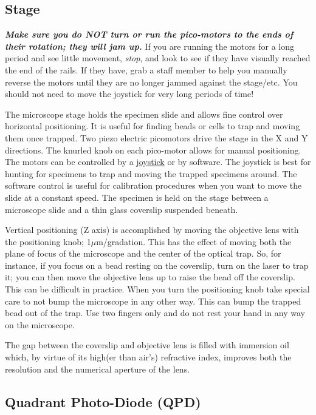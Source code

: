 \documentclass{../lab}
\begin{document}
\subsection{Stage}

\label{sec:stage}

\emph{\textbf{Make sure you do NOT turn or run the pico-motors to the ends of their rotation; they will jam up.}} If you are running the motors for a long period and see little movement, \textit{stop}, and look to see if they have visually reached the end of the rails. If they have, grab a staff member to help you manually reverse the motors until they are no longer jammed against the stage/etc. You should not need to move the joystick for very long periods of time!

The microscope stage holds the specimen slide and allows fine control over horizontal positioning. It is useful for finding beads or cells to trap and moving them once trapped. Two piezo electric picomotors drive the stage in the X and Y directions. The knurled knob on each pico-motor allows for manual positioning. The motors can be controlled by a \href{https://berkeley-physics111b.github.io/assets/pdf/oldwebsitestructure/JoystickManual.pdf}{joystick} or by software. The joystick is best for hunting for specimens to trap and moving the trapped specimens around. The software control is useful for calibration procedures when you want to move the slide at a constant speed. The specimen is held on the stage between a microscope slide and a thin glass coverslip suspended beneath.

Vertical positioning (Z axis) is accomplished by moving the objective lens with the positioning knob; 1$\mu$m/gradation. This has the effect of moving both the plane of focus of the microscope and the center of the optical trap. So, for instance, if you focus on a bead resting on the coverslip, turn on the laser to trap it; you can then move the objective lens up to raise the bead off the coverslip. This can be difficult in practice. When you turn the positioning knob take special care to not bump the microscope in any other way. This can bump the trapped bead out of the trap. Use two fingers only and do not rest your hand in any way on the microscope.

The gap between the coverslip and objective lens is filled with immersion oil which, by virtue of its high(er than air's) refractive index, improves both the resolution and the numerical aperture of the lens.

\subsection{Quadrant Photo-Diode (QPD)}
\end{document}
